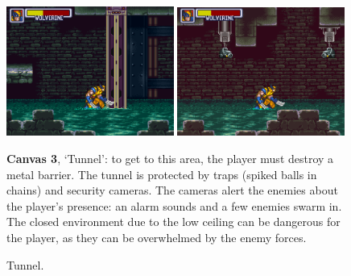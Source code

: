 \documentclass[english]{textolivre}
\begin{document}
\begin{figure}[htbp]
\begin{minipage}[t]{.47\textwidth}
\vspace{0pt}
\includegraphics[width=0.49\textwidth]{fig-6a.png}
\hfill
\includegraphics[width=0.49\textwidth]{fig-6b.png}
\caption{Tunnel.}
\label{fig-6ae6b}
\end{minipage}
\hfill
\begin{minipage}[t]{.47\textwidth}
\vspace{2pt}
\textbf{Canvas 3}, ‘Tunnel’: to get to this area, the player must destroy a metal barrier. The tunnel is protected by traps (spiked balls in chains) and security cameras. The cameras alert the enemies about the player's presence: an alarm sounds and a few enemies swarm in. The closed environment due to the low ceiling can be dangerous for the player, as they can be overwhelmed by the enemy forces.
\end{minipage}
\end{figure}
\end{document}
